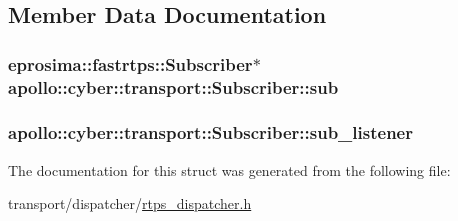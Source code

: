 \subsection{Member Data Documentation}
\hypertarget{structapollo_1_1cyber_1_1transport_1_1Subscriber_a60c84cb092aad26345a6721e04d40fdc}{
\subsubsection[{sub}]{\setlength{\rightskip}{0pt plus 5cm}eprosima\-::fastrtps\-::\-Subscriber$\ast$ apollo\-::cyber\-::transport\-::\-Subscriber\-::sub}}\label{structapollo_1_1cyber_1_1transport_1_1Subscriber_a60c84cb092aad26345a6721e04d40fdc}
\hypertarget{structapollo_1_1cyber_1_1transport_1_1Subscriber_a8da44613e40d55c1f9b449d393af0dad}{
\subsubsection[{sub\-\_\-listener}]{ apollo\-::cyber\-::transport\-::\-Subscriber\-::sub\-\_\-listener}}\label{structapollo_1_1cyber_1_1transport_1_1Subscriber_a8da44613e40d55c1f9b449d393af0dad}


The documentation for this struct was generated from the following file\-:\begin{DoxyCompactItemize}
\item 
transport/dispatcher/\hyperlink{rtps__dispatcher_8h}{rtps\-\_\-dispatcher.\-h}\end{DoxyCompactItemize}
